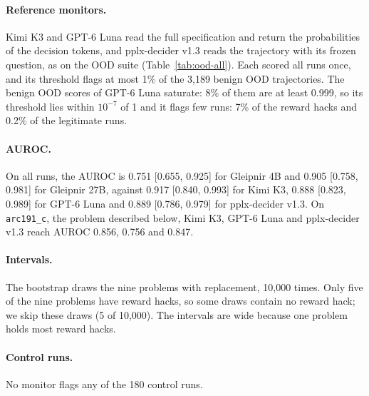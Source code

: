 \paragraph{Reference monitors.}
Kimi K3 and GPT-6 Luna read the full specification and return the probabilities of the decision tokens, and pplx-decider v1.3 reads the trajectory with its frozen question, as on the OOD suite (Table~\ref{tab:ood-all}).
Each scored all runs once, and its threshold flags at most 1\% of the 3,189 benign OOD trajectories.
The benign OOD scores of GPT-6 Luna saturate: 8\% of them are at least 0.999, so its threshold lies within $10^{-7}$ of 1 and it flags few runs: 7\% of the reward hacks and 0.2\% of the legitimate runs.

\paragraph{AUROC.}
On all runs, the AUROC is 0.751 {\scriptsize [0.655, 0.925]} for Gleipnir 4B and 0.905 {\scriptsize [0.758, 0.981]} for Gleipnir 27B, against 0.917 {\scriptsize [0.840, 0.993]} for Kimi K3, 0.888 {\scriptsize [0.823, 0.989]} for GPT-6 Luna and 0.889 {\scriptsize [0.786, 0.979]} for pplx-decider v1.3.
On \texttt{arc191\_c}, the problem described below, Kimi K3, GPT-6 Luna and pplx-decider v1.3 reach AUROC 0.856, 0.756 and 0.847.

\paragraph{Intervals.}
The bootstrap draws the nine problems with replacement, 10,000 times.
Only five of the nine problems have reward hacks, so some draws contain no reward hack; we skip these draws (5 of 10,000).
The intervals are wide because one problem holds most reward hacks.

\paragraph{Control runs.}
No monitor flags any of the 180 control runs.

